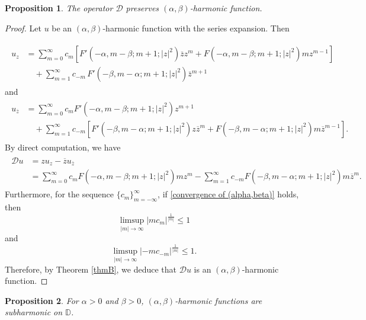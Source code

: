 \documentclass[11pt, reqno]{amsart}
\newtheorem{prop}{Proposition}
\theoremstyle{definition}
\numberwithin{equation}{section}
\newcommand{\abs}[1]{\left\vert#1\right\vert}
\theoremstyle{remark}
\numberwithin{equation}{section}
\begin{document}
	\begin{prop}
    The operator $\mathcal{D}$ preserves $(\alpha,\beta)$-harmonic function.
	\end{prop}
	\begin{proof}
		Let $u$ be an $(\alpha,\beta)$-harmonic function with the series expansion. Then 
		
		\begin{align*}
        \begin{split}
		u_z&=\sum_{m=0}^{\infty}c_m\left[F'(-\alpha,m-\beta; m+1; |z|^2)\overline{z}z^m+F(-\alpha,m-\beta; m+1; |z|^2)mz^{m-1}\right]
		 \\& \quad +\sum_{m=1}^{\infty}
		c_{-m}\,F'(-\beta,m-\alpha; m+1; |z|^2)\bar z^{m+1}
        \end{split}
		\end{align*}  and 
		\begin{align*}
        \begin{split}
			u_{\overline{z}}&=\sum_{m=0}^{\infty}
			c_mF'\left(-\alpha,m-\beta; m+1; |z|^2\right)z^{m+1}\\& \quad+\sum_{m=1}^{\infty}c_{-m}\left[F'\left(-\beta,m-\alpha; m+1; |z|^2\right)z\overline{z}^m+F\left(-\beta,m-\alpha; m+1; |z|^2\right)m\overline{z}^{m-1}\right].
		\end{split}
		\end{align*}
		By direct computation, we have 
		\begin{align*}
        \begin{split}
			\mathcal{D}u&=zu_z-\overline{z}u_{\overline{z}}\\&=\sum_{m=0}^{\infty}c_mF(-\alpha,m-\beta; m+1; |z|^2)mz^{m}-\sum_{m=1}^{\infty}c_{-m}F(-\beta,m-\alpha; m+1; |z|^2)m\overline{z}^{m}.
		\end{split}
		\end{align*}
		Furthermore, for the sequence $\{c_m\}_{m=-\infty}^\infty$, if \eqref{convergence of (alpha,beta)} holds, then 
		$$\limsup\limits_{\abs{m}\rightarrow\infty}|mc_m|^{\frac{1}{|m|}}\leq 1$$ and $$\limsup\limits_{\abs{m}\rightarrow\infty}|-mc_{-m}|^{\frac{1}{|m|}}\leq 1.$$ Therefore, by Theorem \ref{thmB}, we deduce that $\mathcal{D}u$ is an $(\alpha,\beta)$-harmonic function.
	\end{proof}
	\begin{prop} For
    $\alpha>0$ and $\beta>0$, $(\alpha,\beta)$-harmonic functions are subharmonic on $\mathbb{D}$.
\end{prop}
\end{document}
